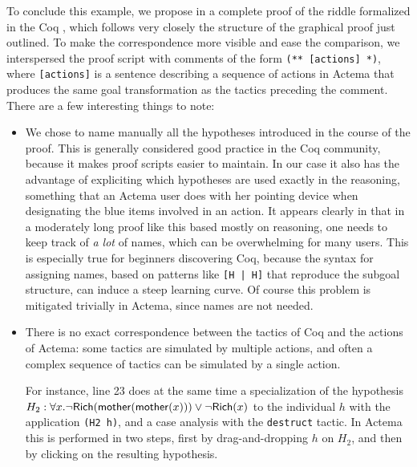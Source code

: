 To conclude this example, we propose in  a complete proof of
the riddle formalized in the Coq , which follows very closely the
structure of the graphical proof just outlined. To make the correspondence more
visible and ease the comparison, we interspersed the proof script with comments
of the form \texttt{(** [actions] *)}, where \texttt{[actions]} is a
sentence describing a sequence of actions in Actema that produces the same goal
transformation as the tactics preceding the comment. There are a few interesting
things to note:
\begin{itemize}
  \item We chose to name manually all the hypotheses introduced in the course of
  the proof. This is generally considered good practice in the Coq community,
  because it makes proof scripts easier to maintain. In our case it also has the
  advantage of expliciting which hypotheses are used exactly in the reasoning,
  something that an Actema user does with her pointing device when designating
  the blue items involved in an action. It appears clearly in
   that in a moderately long proof like this based mostly on
   reasoning, one needs to keep track of \emph{a lot} of names, which can
  be overwhelming for many users. This is especially true for beginners
  discovering Coq, because the syntax for assigning names, based on patterns
  like \texttt{[H | H]} that reproduce the subgoal structure, can induce a steep
  learning curve. Of course this problem is mitigated trivially in Actema, since
  names are not needed.

  \item There is no exact correspondence between the tactics of Coq and the
  actions of Actema: some tactics are simulated by multiple actions, and often a
  complex sequence of tactics can be simulated by a single action.
  
  For instance, line 23 does at the same time a specialization of the hypothesis
  $H_2 : \forall x. \neg \mbox{\textsf{Rich}}(\mbox{\textsf{mother}}(\mbox{\textsf{mother}}(x))) \lor \neg \mbox{\textsf{Rich}}(x)$ to the
  individual $h$ with the application \texttt{(H2 h)}, and a case analysis with
  the \texttt{destruct} tactic. In Actema this is performed in two steps, first
  by drag-and-dropping $h$ on $H_2$, and then by clicking on the resulting
  hypothesis.


\end{itemize}
